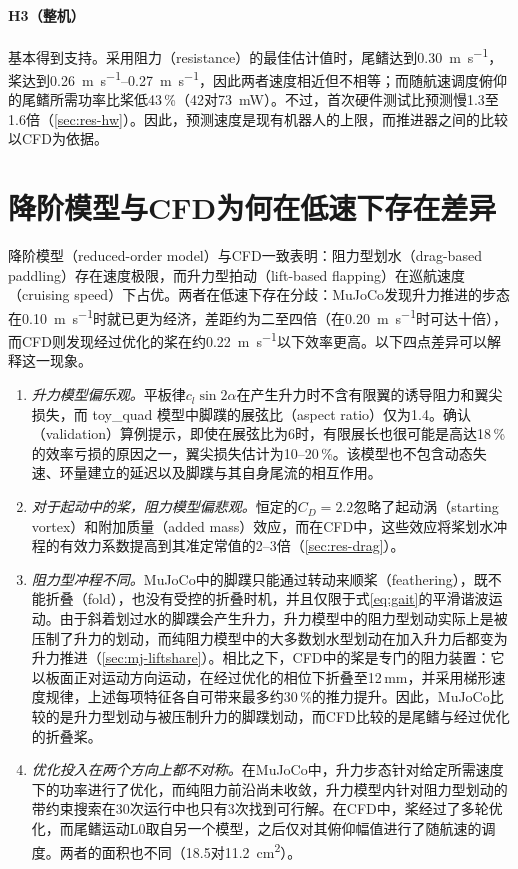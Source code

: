 \paragraph{H3（整机）}基本得到支持。采用阻力（resistance）的最佳估计值时，尾鳍达到\SI{0.30}{\metre\per\second}，桨达到\SIrange{0.26}{0.27}{\metre\per\second}，因此两者速度相近但不相等；而随航速调度俯仰的尾鳍所需功率比桨低43\,\%（\SI{42}{}对\SI{73}{\milli\watt}）。不过，首次硬件测试比预测慢1.3至1.6倍（\cref{sec:res-hw}）。因此，预测速度是现有机器人的上限，而推进器之间的比较以CFD为依据。

\section{降阶模型与CFD为何在低速下存在差异}
\label{sec:disc-models}

降阶模型（reduced-order model）与CFD一致表明：阻力型划水（drag-based paddling）存在速度极限，而升力型拍动（lift-based flapping）在巡航速度（cruising speed）下占优。两者在低速下存在分歧：MuJoCo发现升力推进的步态在\SI{0.10}{\metre\per\second}时就已更为经济，差距约为二至四倍（在\SI{0.20}{\metre\per\second}时可达十倍），而CFD则发现经过优化的桨在约\SI{0.22}{\metre\per\second}以下效率更高。以下四点差异可以解释这一现象。
\begin{enumerate}
  \item \emph{升力模型偏乐观。}平板律$c_l\sin2\alpha$在产生升力时不含有限翼的诱导阻力和翼尖损失，而 toy\_quad 模型中脚蹼的展弦比（aspect ratio）仅为1.4。确认（validation）算例提示，即使在展弦比为6时，有限展长也很可能是高达18\,\%的效率亏损的原因之一，翼尖损失估计为10--20\,\%。该模型也不包含动态失速、环量建立的延迟以及脚蹼与其自身尾流的相互作用。
  \item \emph{对于起动中的桨，阻力模型偏悲观。}恒定的$C_D=2.2$忽略了起动涡（starting vortex）和附加质量（added mass）效应，而在CFD中，这些效应将桨划水冲程的有效力系数提高到其准定常值的2--3倍（\cref{sec:res-drag}）。
  \item \emph{阻力型冲程不同。}MuJoCo中的脚蹼只能通过转动来顺桨（feathering），既不能折叠（fold），也没有受控的折叠时机，并且仅限于式\eqref{eq:gait}的平滑谐波运动。由于斜着划过水的脚蹼会产生升力，升力模型中的阻力型划动实际上是被压制了升力的划动，而纯阻力模型中的大多数划水型划动在加入升力后都变为升力推进（\cref{sec:mj-liftshare}）。相比之下，CFD中的桨是专门的阻力装置：它以板面正对运动方向运动，在经过优化的相位下折叠至12\,mm，并采用梯形速度规律，上述每项特征各自可带来最多约30\,\%的推力提升。因此，MuJoCo比较的是升力型划动与被压制升力的脚蹼划动，而CFD比较的是尾鳍与经过优化的折叠桨。
  \item \emph{优化投入在两个方向上都不对称。}在MuJoCo中，升力步态针对给定所需速度下的功率进行了优化，而纯阻力前沿尚未收敛，升力模型内针对阻力型划动的带约束搜索在30次运行中也只有3次找到可行解。在CFD中，桨经过了多轮优化，而尾鳍运动L0取自另一个模型，之后仅对其俯仰幅值进行了随航速的调度。两者的面积也不同（\SI{18.5}{}对\SI{11.2}{\square\centi\metre}）。
\end{enumerate}
